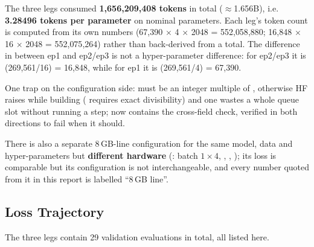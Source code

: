 \documentclass[11pt,openany]{article}
\begin{document}
The three legs consumed \textbf{1{,}656{,}209{,}408 tokens} in total ($\approx$1.656B), i.e.
\textbf{3.28496 tokens per parameter} on nominal parameters. Each leg's token count is computed
from its own numbers (67{,}390 $\times$ 4 $\times$ 2048 = 552{,}058{,}880;
16{,}848 $\times$ 16 $\times$ 2048 = 552{,}075{,}264) rather than back-derived from a total. The
difference in  between ep1 and ep2/ep3 is not a hyper-parameter difference: for
ep2/ep3 it is (269{,}561/16) = 16{,}848, while for ep1 it is
(269{,}561/4) = 67{,}390.

One trap on the configuration side:  must be an integer multiple of
, otherwise HF raises  while building \linebreak[0]
(\linebreak[0]\linebreak[0] requires exact divisibility) and one wastes a whole queue
slot without running a step; \linebreak[0]\linebreak[0] now contains the cross-field
check, verified in both directions to fail when it should.

There is also a separate 8\,GB-line configuration for the same model, data and hyper-parameters
but \textbf{different hardware} (\linebreak[0]: batch $1\times4$,
\linebreak[0]\linebreak[0], \linebreak[0]\linebreak[0], \linebreak[0]\linebreak[0]); its loss is
comparable but its configuration is not interchangeable, and every number quoted from it in this
report is labelled ``8\,GB line''.

\subsection{Loss Trajectory}

The three legs contain 29 validation evaluations in total, all listed here.
\end{document}
